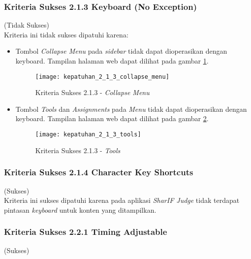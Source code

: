 \subsubsection{Kriteria Sukses 2.1.3 Keyboard (No Exception)}
\label{subsubsec:kepatuhan_kriteria_2.1.3}
(Tidak Sukses) \\

Kriteria ini tidak sukses dipatuhi karena:
\begin{itemize}
	\item Tombol \textit{Collapse Menu} pada \textit{sidebar} tidak dapat dioperasikan dengan keyboard. Tampilan halaman web dapat dilihat pada gambar \ref{fig:kepatuhan_2_1_3_collapse_menu}.
	\begin{figure}[H]
		\centering  
		\texttt{[image: kepatuhan\_2\_1\_3\_collapse\_menu]}  
		\caption[Kriteria Sukses 2.1.3 - \textit{Collapse Menu}]{Kriteria Sukses 2.1.3 - \textit{Collapse Menu}} 
		\label{fig:kepatuhan_2_1_3_collapse_menu} 
	\end{figure}

	\item Tombol \textit{Tools} dan \textit{Assignments} pada \textit{Menu} tidak dapat dioperasikan dengan keyboard. Tampilan halaman web dapat dilihat pada gambar \ref{fig:kepatuhan_2_1_3_tools}.
	\begin{figure}[H]
		\centering  
		\texttt{[image: kepatuhan\_2\_1\_3\_tools]}  
		\caption[Kriteria Sukses 2.1.3 - \textit{Tools}]{Kriteria Sukses 2.1.3 - \textit{Tools}} 
		\label{fig:kepatuhan_2_1_3_tools} 
	\end{figure}

\end{itemize}

\subsubsection{Kriteria Sukses 2.1.4 Character Key Shortcuts}
\label{subsubsec:kepatuhan_kriteria_2.1.4}
(Sukses) \\

Kriteria ini sukses dipatuhi karena pada aplikasi \textit{SharIF Judge} tidak terdapat pintasan \textit{keyboard} untuk konten yang ditampilkan.

\subsubsection{Kriteria Sukses 2.2.1 Timing Adjustable}
\label{subsubsec:kepatuhan_kriteria_2.2.1}
(Sukses) \\


